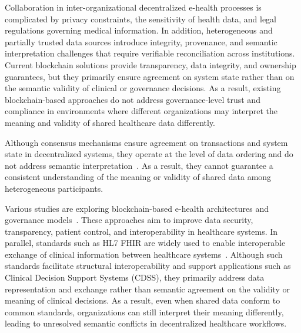 \documentclass[journal]{IEEEtran}
\begin{document}
Collaboration in inter-organizational decentralized e-health processes is complicated by privacy constraints, the sensitivity of health data, and legal regulations governing medical information. In addition, heterogeneous and partially trusted data sources introduce integrity, provenance, and semantic interpretation challenges that require verifiable reconciliation across institutions. Current blockchain solutions provide transparency, data integrity, and ownership guarantees, but they primarily ensure agreement on system state rather than on the semantic validity of clinical or governance decisions. As a result, existing blockchain-based approaches do not address governance-level trust and compliance in environments where different organizations may interpret the meaning and validity of shared healthcare data differently.

Although consensus mechanisms ensure agreement on transactions and system state in decentralized systems, they operate at the level of data ordering and do not address semantic interpretation~\cite{10075075, Nasir2024, AlAwamy2025, yakubu2024systematic}. As a result, they cannot guarantee a consistent understanding of the meaning or validity of shared data among heterogeneous participants.

Various studies are exploring blockchain-based e-health architectures and governance models~\cite{Andrew2023,elvas2023sharing,alruwaill2025hchain,Villarreal2023,jha2025blockchain}. These approaches aim to improve data security, transparency, patient control, and interoperability in healthcare systems. In parallel, standards such as HL7 FHIR are widely used to enable interoperable exchange of clinical information between healthcare systems~\cite{gazzarata2024hl7}. Although such standards facilitate structural interoperability and support applications such as Clinical Decision Support Systems (CDSS), they primarily address data representation and exchange rather than semantic agreement on the validity or meaning of clinical decisions. As a result, even when shared data conform to common standards, organizations can still interpret their meaning differently, leading to unresolved semantic conflicts in decentralized healthcare workflows.
\end{document}

